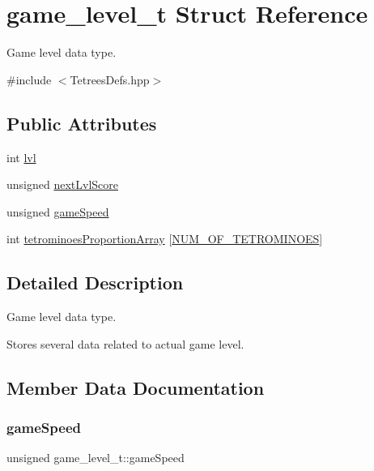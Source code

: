 \hypertarget{structgame__level__t}{}\section{game\+\_\+level\+\_\+t Struct Reference}
\label{structgame__level__t}


Game level data type.  




{\ttfamily \#include $<$Tetrees\+Defs.\+hpp$>$}

\subsection*{Public Attributes}
\begin{DoxyCompactItemize}
\item 
int \mbox{\hyperlink{structgame__level__t_ab80383a9c51e3ad25cda4df0a7df8df2}{lvl}}
\item 
unsigned \mbox{\hyperlink{structgame__level__t_a9f5f86c9c90bebdd20950d74bf2dd450}{next\+Lvl\+Score}}
\item 
unsigned \mbox{\hyperlink{structgame__level__t_a2501f9b624ec9cf7788649127e111a33}{game\+Speed}}
\item 
int \mbox{\hyperlink{structgame__level__t_abcef20ad8f4df7d270a4d5111ac8d85a}{tetrominoes\+Proportion\+Array}} \mbox{[}\mbox{\hyperlink{TetreesDefs_8hpp_a69fa4aa1afe74f7f9ec42bf1e07ddf28}{N\+U\+M\+\_\+\+O\+F\+\_\+\+T\+E\+T\+R\+O\+M\+I\+N\+O\+ES}}\mbox{]}
\end{DoxyCompactItemize}


\subsection{Detailed Description}
Game level data type. 

Stores several data related to actual game level. 

\subsection{Member Data Documentation}
\mbox{\label{structgame__level__t_a2501f9b624ec9cf7788649127e111a33}} 
\subsubsection{\texorpdfstring{game\+Speed}{gameSpeed}}
{\footnotesize\ttfamily unsigned game\+\_\+level\+\_\+t\+::game\+Speed}

